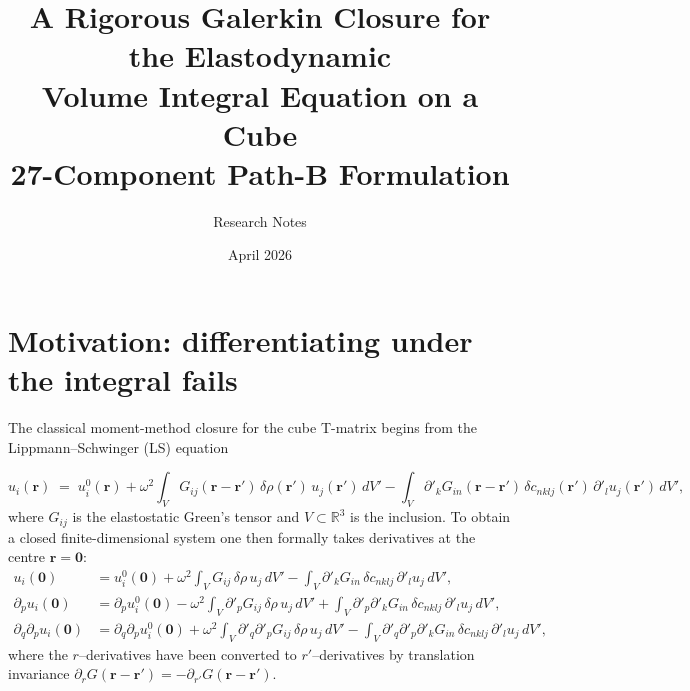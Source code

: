 \documentclass[11pt,a4paper]{article}
\title{A Rigorous Galerkin Closure for the Elastodynamic\\
Volume Integral Equation on a Cube\\
\large 27-Component Path-B Formulation}
\author{Research Notes}
\date{April 2026}
\newcommand{\br}{\bm{r}}
\newcommand{\R}{\mathbb{R}}
\theoremstyle{plain}
\theoremstyle{definition}
\theoremstyle{remark}
\begin{document}
\maketitle
\tableofcontents
\vspace{1em}

\section{Motivation: differentiating under the integral fails}

{\sloppy
The classical moment-method closure for the cube T-matrix begins from the
Lippmann--Schwinger (LS) equation\par}
\begin{equation}
  u_i(\br) \;=\; u_i^{0}(\br)
   + \omega^2 \!\int_V G_{ij}(\br - \br')\,\delta\rho(\br')\, u_j(\br')\,dV'
   - \!\int_V \partial'_k G_{in}(\br - \br')\,\delta c_{nklj}(\br')\,
   \partial'_l u_j(\br')\,dV',
   \label{eq:LS}
\end{equation}
where $G_{ij}$ is the elastostatic Green's tensor and $V \subset \R^3$ is the
inclusion. To obtain a closed finite-dimensional system one then formally
takes derivatives at the centre $\br = \mathbf{0}$:
\begin{align}
   u_i(\mathbf{0}) &= u_i^{0}(\mathbf{0}) + \omega^2\!\int_V G_{ij} \,\delta\rho\, u_j\, dV'
                       - \!\int_V \partial'_k G_{in}\,\delta c_{nklj}\,\partial'_l u_j\, dV', \nonumber\\
   \partial_p u_i(\mathbf{0}) &= \partial_p u_i^{0}(\mathbf{0})
                       - \omega^2\!\int_V \partial'_p G_{ij} \,\delta\rho\, u_j\, dV'
                       + \!\int_V \partial'_p \partial'_k G_{in}\,\delta c_{nklj}\,\partial'_l u_j\, dV', \label{eq:LS-derivs}\\
   \partial_q\partial_p u_i(\mathbf{0}) &= \partial_q\partial_p u_i^{0}(\mathbf{0})
                       + \omega^2\!\int_V \partial'_q\partial'_p G_{ij} \,\delta\rho\, u_j\, dV'
                       - \!\int_V \partial'_q\partial'_p\partial'_k G_{in}\,\delta c_{nklj}\,\partial'_l u_j\, dV',
   \nonumber
\end{align}
where the $r$--derivatives have been converted to $r'$--derivatives by translation
invariance $\partial_r G(\br - \br') = -\partial_{r'} G(\br - \br')$.

\medskip
\end{document}

